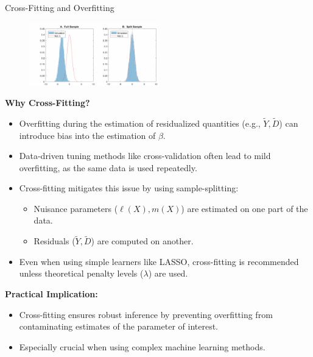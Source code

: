 \documentclass[xcolor=svgnames,t]{beamer}
\begin{document}
            \begin{frame}{Cross-Fitting and Overfitting}
                \begin{figure}
                    \centering
                    \includegraphics[width=0.5\textwidth]{Figures/overfitting.png}
                \end{figure}
                
                \pause
                \scriptsize
                \textbf{Why Cross-Fitting?}
                \begin{itemize}
                    \item Overfitting during the estimation of residualized quantities (e.g., \(\tilde{Y}, \tilde{D}\)) can introduce bias into the estimation of \(\beta\).
                    \pause
                    \item Data-driven tuning methods like cross-validation often lead to mild overfitting, as the same data is used repeatedly.
                    \pause
                    \item Cross-fitting mitigates this issue by using sample-splitting:
                    \begin{itemize}
                        \scriptsize
                        \item Nuisance parameters (\(\ell(X), m(X)\)) are estimated on one part of the data.
                        \item Residuals (\(\tilde{Y}, \tilde{D}\)) are computed on another.
                    \end{itemize}
                    \pause
                    \item Even when using simple learners like LASSO, cross-fitting is recommended unless theoretical penalty levels (\(\lambda\)) are used.
                \end{itemize}
                
                \pause
                
                \textbf{Practical Implication:}
                \begin{itemize}
                    \item Cross-fitting ensures robust inference by preventing overfitting from contaminating estimates of the parameter of interest.
                    \item Especially crucial when using complex machine learning methods.
                \end{itemize}
                \end{frame}
\end{document}
